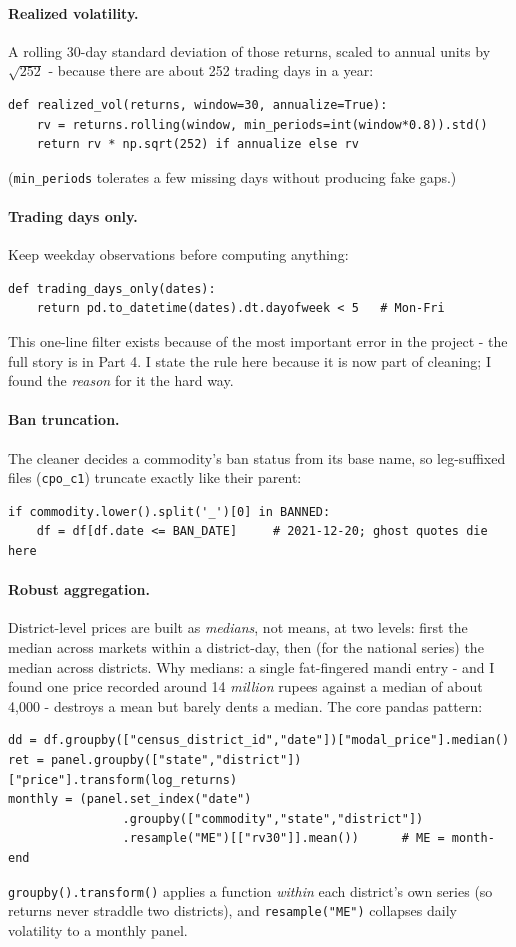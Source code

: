 \documentclass[11pt]{article}
\begin{document}
\paragraph{Realized volatility.} A rolling 30-day standard deviation of those returns,
scaled to annual units by $\sqrt{252}$ - because there are about 252 trading days in a
year:
\begin{verbatim}
def realized_vol(returns, window=30, annualize=True):
    rv = returns.rolling(window, min_periods=int(window*0.8)).std()
    return rv * np.sqrt(252) if annualize else rv
\end{verbatim}
(\texttt{min\_periods} tolerates a few missing days without producing fake gaps.)

\paragraph{Trading days only.} Keep weekday observations before computing anything:
\begin{verbatim}
def trading_days_only(dates):
    return pd.to_datetime(dates).dt.dayofweek < 5   # Mon-Fri
\end{verbatim}
This one-line filter exists because of the most important error in the project - the full
story is in Part 4. I state the rule here because it is now part of cleaning; I found the
\emph{reason} for it the hard way.

\paragraph{Ban truncation.} The cleaner decides a commodity's ban status from its base
name, so leg-suffixed files (\texttt{cpo\_c1}) truncate exactly like their parent:
\begin{verbatim}
if commodity.lower().split('_')[0] in BANNED:
    df = df[df.date <= BAN_DATE]     # 2021-12-20; ghost quotes die here
\end{verbatim}

\paragraph{Robust aggregation.} District-level prices are built as \emph{medians}, not
means, at two levels: first the median across markets within a district-day, then (for the
national series) the median across districts. Why medians: a single fat-fingered mandi
entry - and I found one price recorded around 14 \emph{million} rupees against a median of
about 4{,}000 - destroys a mean but barely dents a median. The core pandas pattern:
\begin{verbatim}
dd = df.groupby(["census_district_id","date"])["modal_price"].median()
ret = panel.groupby(["state","district"])["price"].transform(log_returns)
monthly = (panel.set_index("date")
                .groupby(["commodity","state","district"])
                .resample("ME")[["rv30"]].mean())      # ME = month-end
\end{verbatim}
\texttt{groupby().transform()} applies a function \emph{within} each district's own series
(so returns never straddle two districts), and \texttt{resample("ME")} collapses daily
volatility to a monthly panel.
\end{document}
